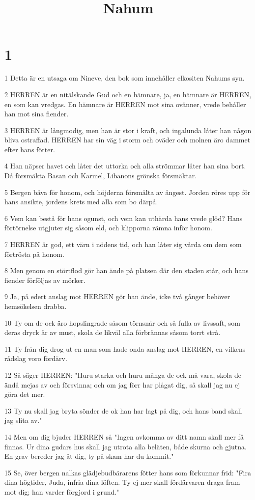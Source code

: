

\title{Nahum}


\chapter{1}

\par 1 Detta är en utsaga om Nineve, den bok som innehåller elkositen Nahums syn.
\par 2 HERREN är en nitälskande Gud och en hämnare, ja, en hämnare är HERREN, en som kan vredgas. En hämnare är HERREN mot sina ovänner, vrede behåller han mot sina fiender.
\par 3 HERREN är långmodig, men han är stor i kraft, och ingalunda låter han någon bliva ostraffad. HERREN har sin väg i storm och oväder och molnen äro dammet efter hans fötter.
\par 4 Han näpser havet och låter det uttorka och alla strömmar låter han sina bort. Då försmäkta Basan och Karmel, Libanons grönska försmäktar.
\par 5 Bergen bäva för honom, och höjderna försmälta av ångest. Jorden röres upp för hans ansikte, jordens krets med alla som bo därpå.
\par 6 Vem kan bestå för hans ogunst, och vem kan uthärda hans vrede glöd? Hans förtörnelse utgjuter sig såsom eld, och klipporna rämna inför honom.
\par 7 HERREN är god, ett värn i nödens tid, och han låter sig vårda om dem som förtrösta på honom.
\par 8 Men genom en störtflod gör han ände på platsen där den staden står, och hans fiender förföljas av mörker.
\par 9 Ja, på edert anslag mot HERREN gör han ände, icke två gånger behöver hemsökelsen drabba.
\par 10 Ty om de ock äro hopslingrade såsom törnsnår och så fulla av livssaft, som deras dryck är av must, skola de likväl alla förbrännas såsom torrt strå.
\par 11 Ty från dig drog ut en man som hade onda anslag mot HERREN, en vilkens rådslag voro fördärv.
\par 12 Så säger HERREN: "Huru starka och huru många de ock må vara, skola de ändå mejas av och försvinna; och om jag förr har plågat dig, så skall jag nu ej göra det mer.
\par 13 Ty nu skall jag bryta sönder de ok han har lagt på dig, och hans band skall jag slita av."
\par 14 Men om dig bjuder HERREN så "Ingen avkomma av ditt namn skall mer få finnas. Ur dina gudars hus skall jag utrota alla beläten, både skurna och gjutna. En grav bereder jag åt dig, ty på skam har du kommit."
\par 15 Se, över bergen nalkas glädjebudbärarens fötter hans som förkunnar frid: "Fira dina högtider, Juda, infria dina löften. Ty ej mer skall fördärvaren draga fram mot dig; han varder förgjord i grund."

